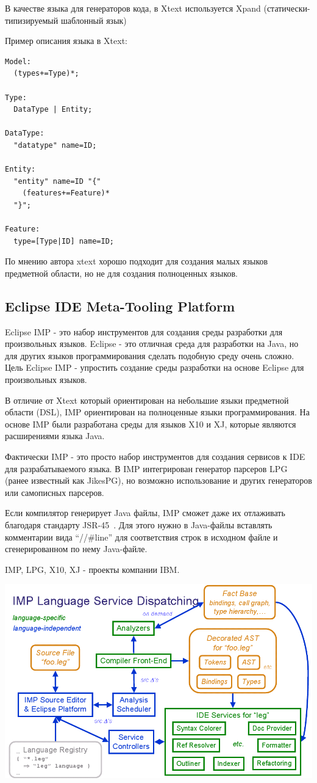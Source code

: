 \documentclass[a4paper,12pt]{article}
\begin{document}
В качестве языка для генераторов кода, в Xtext используется Xpand
(статически-типизируемый шаблонный язык)

\begin{example}
Пример описания языка в Xtext:
\end{example}
\begin{verbatim}
Model:
  (types+=Type)*;

Type:
  DataType | Entity;

DataType:
  "datatype" name=ID;

Entity:
  "entity" name=ID "{"
    (features+=Feature)* 
  "}";

Feature:
  type=[Type|ID] name=ID;   
\end{verbatim}

По мнению автора xtext хорошо подходит для создания малых языков предметной
области, но не для создания полноценных языков. 

\subsection{Eclipse IDE Meta-Tooling Platform}
Eclipse IMP - это набор инструментов для создания среды разработки для
произвольных языков.
Eclipse - это отличная среда для разработки на Java, но для
других языков программирования сделать подобную среду очень сложно. Цель
Eclipse IMP - упростить создание среды разработки на основе Eclipse для
произвольных языков.

В отличие от Xtext который ориентирован на небольшие языки предметной области
(DSL), IMP ориентирован на полноценные языки программирования. На основе IMP
были разработана среды для языков X10 и XJ, которые являются расширениями
языка Java.

Фактически IMP - это просто набор инструментов для создания сервисов к IDE для
разрабатываемого языка. В IMP интегрирован генератор парсеров LPG (ранее
известный как JikesPG), но возможно использование и других генераторов или
самописных парсеров.

Если компилятор генерирует Java файлы, IMP сможет даже их отлаживать благодаря
стандарту JSR-45~\cite{JSR45}. Для этого нужно в Java-файлы вставлять
комментарии вида ``//\#line'' для соответствия строк в исходном файле и сгенерированном по нему Java-файле.

IMP, LPG, X10, XJ - проекты компании IBM.

\includegraphics[scale=0.4]{img/imp.png}
\end{document}
